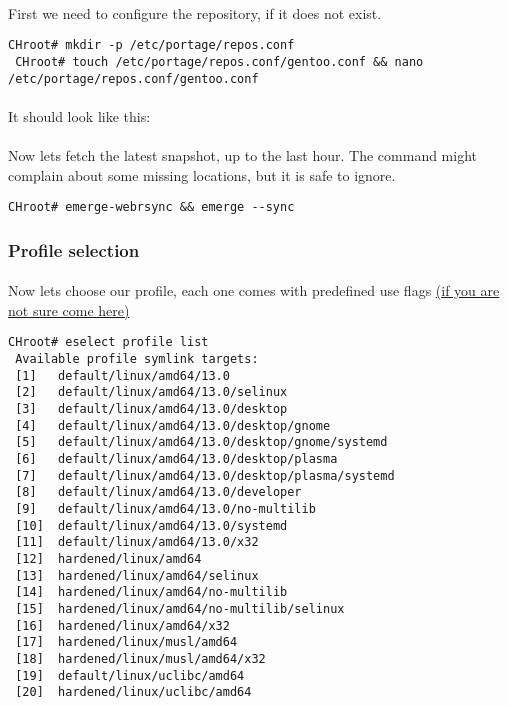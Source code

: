 \documentclass[10pt,a4paper]{article}
\begin{document}
                \paragraph{} First we need to configure the repository, if it does not exist.  

\begin{lstlisting}[style=BashInputCHRoot]
 CHroot# mkdir -p /etc/portage/repos.conf
 CHroot# touch /etc/portage/repos.conf/gentoo.conf && nano /etc/portage/repos.conf/gentoo.conf
\end{lstlisting}

                \paragraph{} It should look like this:
            

            
                \paragraph{} Now lets fetch the latest snapshot, up to the last hour. The command might complain about some missing locations, but it is safe to ignore.

\begin{lstlisting}[style=BashInputCHRoot]
 CHroot# emerge-webrsync && emerge --sync
\end{lstlisting}
               
           \newpage
            \subsubsection{Profile selection}
            
                \paragraph{} Now lets choose our profile, each one comes with predefined use flags \href{https://wiki.gentoo.org/wiki/Handbook:PPC/Working/USE}{(if you are not sure come here)}
            
\begin{lstlisting}[style=BashInputCHRoot]
 CHroot# eselect profile list
 Available profile symlink targets:
 [1]   default/linux/amd64/13.0
 [2]   default/linux/amd64/13.0/selinux
 [3]   default/linux/amd64/13.0/desktop
 [4]   default/linux/amd64/13.0/desktop/gnome
 [5]   default/linux/amd64/13.0/desktop/gnome/systemd
 [6]   default/linux/amd64/13.0/desktop/plasma
 [7]   default/linux/amd64/13.0/desktop/plasma/systemd
 [8]   default/linux/amd64/13.0/developer
 [9]   default/linux/amd64/13.0/no-multilib
 [10]  default/linux/amd64/13.0/systemd
 [11]  default/linux/amd64/13.0/x32
 [12]  hardened/linux/amd64
 [13]  hardened/linux/amd64/selinux
 [14]  hardened/linux/amd64/no-multilib
 [15]  hardened/linux/amd64/no-multilib/selinux
 [16]  hardened/linux/amd64/x32
 [17]  hardened/linux/musl/amd64
 [18]  hardened/linux/musl/amd64/x32
 [19]  default/linux/uclibc/amd64
 [20]  hardened/linux/uclibc/amd64
\end{lstlisting}
        
\end{document}
